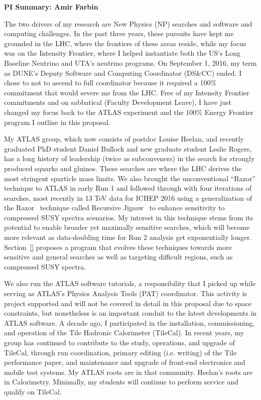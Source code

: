 
\begin{center}
\Large\textbf{PI Summary: Amir Farbin}
\end{center}

The two drivers of my research are New Physics (NP) searches and
software and computing challenges. In the past three years, these
pursuits have kept me grounded in the LHC, where the frontiers of
these areas reside, while my focus was on the Intensity Frontier,
where I helped instantiate both the US's Long Baseline Neutrino and
UTA's neutrino programs. On September 1, 2016, my term as DUNE's
Deputy Software and Computing Coordinator (DS\&CC) ended. I chose to
not to ascend to full coordinator because it required a 100\%
commitment that would severe me from the LHC. Free of my Intensity
Frontier commitments and on sabbatical (Faculty Development Leave), I
have just changed my focus back to the ATLAS experiment and the 100\%
Energy Frontier program I outline in this proposal.

My ATLAS group, which now consists of postdoc Louise Heelan, and
recently graduated PhD student Daniel Bullock and new graduate student
Leslie Rogers, has a long history of leadership (twice as
subconveners) in the search for strongly produced squarks and
gluinos. These searches are where the LHC derives the most stringent
sparticle mass limits. We also brought the unconventional ``Razor''
technique to ATLAS in early Run 1 and followed through with four
iterations of searches, most recently in 13 TeV data for ICHEP 2016
using a generalization of the Razor~\cite{} technique called Recursive
Jigsaw~\cite{} to enhance sensitivity to compressed SUSY spectra
scenarios. My interest in this technique stems from its potential to
enable broader yet maximally sensitive searches, which will become
more relevant as data-doubling time for Run 2 analysis get
exponentially longer.  Section~\ref{} proposes a program that evolves
these techniques towards more sensitive and general searches as well
as targeting difficult regions, such as compressed SUSY spectra.

We also run the ATLAS software tutorials, a responsibility that I
picked up while serving as ATLAS's Physics Analysis Tools (PAT)
coordinator. This activity is project supported and will not be
covered in detail in this proposal due to space constraints, but
nonetheless is an important conduit to the latest developments in
ATLAS software. A decade ago, I participated in the installation,
commissioning, and operation of the Tile Hadronic Calorimeter
(TileCal). In recent years, my group has continued to contribute to
the study, operations, and upgrade of TileCal, through run
coordination, primary editing (i.e. writing) of the Tile performance
paper, and maintenance and upgrade of front-end electronics and mobile
test systems. My ATLAS roots are in that community. Heelan's roots are
in Calorimetry. Minimally, my students will continue to perform
service and qualify on TileCal.

